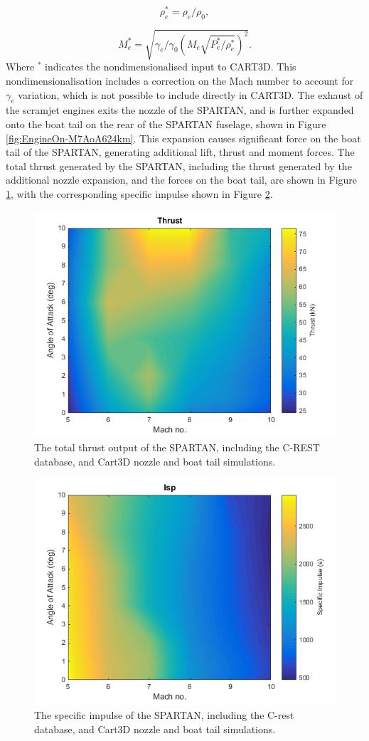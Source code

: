 		\begin{equation}
		\rho_e^* = \rho_e/\rho_0,
		\end{equation}
		
		\begin{equation}
		M_e^* = \sqrt{\gamma_e/\gamma_0 (M_e \sqrt{ P_e^*/\rho_e^*})^2}.
		\end{equation}
		Where $^*$ indicates the nondimensionalised input to CART3D. This nondimensionalisation includes a correction on the Mach number to account for $\gamma_e$ variation, which is not possible to include directly in CART3D\cite{Mehta2016}. The exhaust of the scramjet engines exits the nozzle of the SPARTAN, and is further expanded onto the boat tail on the rear of the SPARTAN fuselage, shown in Figure \ref{fig:EngineOn-M7AoA624km}. This expansion causes significant force on the boat tail of the SPARTAN, generating additional lift, thrust and moment forces. The total thrust generated by the SPARTAN, including the thrust generated by the additional nozzle expansion, and the forces on the boat tail, are shown in Figure \ref{fig:Thrust}, with the corresponding specific impulse shown in Figure \ref{fig:Isp}.
		
		
	
		\begin{figure}[ht]
			\centering
			\includegraphics[width=0.6\linewidth]{figures/3_vehicle_design/Thrust}
			\caption{The total thrust output of the SPARTAN, including the C-REST database, and Cart3D nozzle and boat tail simulations.}
			\label{fig:Thrust}
		\end{figure}
		
		\begin{figure}[ht]
			\centering
			\includegraphics[width=0.6\linewidth]{figures/3_vehicle_design/Isp}
			\caption{The specific impulse of the SPARTAN, including the C-rest database, and Cart3D nozzle and boat tail simulations.}
			\label{fig:Isp}
		\end{figure}
		
